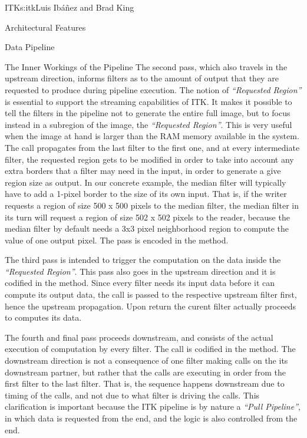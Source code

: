 \begin{aosachapter}{ITK}{s:itk}{Luis Ib\'{a}\~{n}ez and Brad King}
\begin{aosasect1}{Architectural Features}
\begin{aosasect2}{Data Pipeline}
\begin{aosasect3}{The Inner Workings of the Pipeline}
The second pass, which also travels in the upstream direction, informs
filters as to the amount of output that they are requested to
produce during pipeline execution. The notion of \emph{``Requested Region''} is essential
to support the streaming capabilities of ITK. It makes it possible to tell the
filters in the pipeline not to generate the entire full image, but to focus
instead in a subregion of the image, the \emph{``Requested Region''}. This is
very useful when the image at hand is larger than the RAM memory available in
the system. The call propagates from the last filter to the first one, and at
every intermediate filter, the requested region gets to be modified in order to
take into account any extra borders that a filter may need in the input, in
order to generate a give region size as output. In our concrete example, the
median filter will typically have to add a 1-pixel border to the size of its
own input. That is, if the writer requests a region of size 500 x 500 pixels to
the median filter, the median filter in its turn will request a region of size
502 x 502 pixels to the reader, because the median filter by default needs a
3x3 pixel neighborhood region to compute the value of one output pixel. The pass is
encoded in the  method.

The third pass is intended to trigger the computation on the data inside the
\emph{``Requested Region''}. This pass also goes in the upstream direction and
it is codified in the  method.  Since every filter
needs its input data before it can compute its output data, the call is passed
to the respective upstream filter first, hence the upstream propagation. Upon
return the curent filter actually proceeds to computes its data.

The fourth and final pass proceeds downstream, and consists of the actual
execution of computation by every filter. The call is codified in the
 method. The downstream direction is not a consequence
of one filter making calls on the its downstream partner, but rather that the  calls are executing in order from the
first filter to the last filter. That is, the sequence happens downstream due
to timing of the calls, and not due to what filter is driving the calls. This
clarification is important because the ITK pipeline is by nature a \emph{``Pull
Pipeline''}, in which data is requested from the end, and the logic is also
controlled from the end.

\end{aosasect3}


\end{aosasect2}
\end{aosasect1}
\end{aosachapter}
